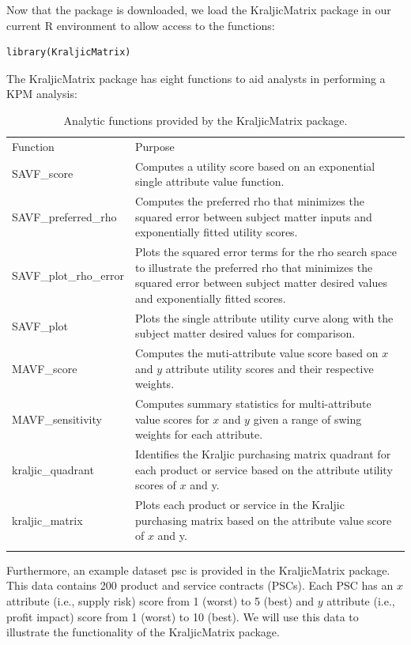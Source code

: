 \documentclass[twocolumn]{svjour3}       %
\begin{document}
Now that the package is downloaded, we load the KraljicMatrix package in our current R environment to allow access to the functions:
\begin{Verbatim}[fontsize=\footnotesize]
library(KraljicMatrix)
\end{Verbatim}
The KraljicMatrix package has eight functions to aid analysts in performing a KPM analysis:
\begin{table}[!htb]
  \centering
  \caption{Analytic functions provided by the KraljicMatrix package.}
  \label{tab:1}       %
  \begin{tabular}{lp{10cm}}
    \hline\noalign{\smallskip}
    Function & Purpose  \\
    \noalign{\smallskip}\hline\noalign{\smallskip}
    SAVF\_score & Computes a utility score based on an exponential single attribute value function. \\
    SAVF\_preferred\_rho & Computes the preferred rho that minimizes the squared error between subject matter inputs and exponentially fitted utility scores. \\
    SAVF\_plot\_rho\_error & Plots the squared error terms for the rho search space to illustrate the preferred rho that minimizes the squared error between subject matter desired values and exponentially fitted scores. \\
    SAVF\_plot & Plots the single attribute utility curve along with the subject matter desired values for comparison. \\
    MAVF\_score & Computes the muti-attribute value score based on $x$ and $y$ attribute utility scores and their respective weights. \\
    MAVF\_sensitivity & Computes summary statistics for multi-attribute value scores for $x$ and $y$ given a range of swing weights for each attribute. \\
    kraljic\_quadrant & Identifies the Kraljic purchasing matrix quadrant for each product or service based on the attribute utility scores of $x$ and y. \\
    kraljic\_matrix & Plots each product or service in the Kraljic purchasing matrix based on the attribute value score of $x$ and y. \\
    \noalign{\smallskip}\hline
  \end{tabular}
\end{table}

Furthermore, an example dataset psc is provided in the KraljicMatrix package. This data contains 200 product and service contracts (PSCs). Each PSC has an $x$ attribute (i.e., supply risk) score from 1 (worst) to 5 (best) and $y$ attribute (i.e., profit impact) score from 1 (worst) to 10 (best).  We will use this data to illustrate the functionality of the KraljicMatrix package.
\end{document}
